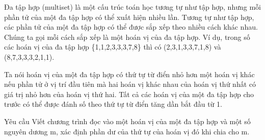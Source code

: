 Đa tập hợp (multiset) là một cấu trúc toán học tương tự như tập hợp, nhưng mỗi phần tử của một đa tập hợp có thể xuất hiện nhiều lần. Tương tự như tập hợp, các phần tử của một đa tập hợp có thể được sắp xếp theo nhiều cách khác nhau. Chúng ta gọi mỗi cách sắp xếp là một hoán vị của đa tập hợp. Ví dụ, trong số các hoán vị của đa tập hợp \{1,1,2,3,3,3,7,8\} thì có (2,3,1,3,3,7,1,8) và (8,7,3,3,3,2,1,1).  

   Ta nói hoán vị của một đa tập hợp có thứ tự từ điển nhỏ hơn một hoán vị khác nếu phần tử ở vị trí đầu tiên mà hai hoán vị khác nhau của hoán vị thứ nhất có giá trị nhỏ hơn của hoán vị thứ hai. Tất cả các hoán vị của một đa tập hợp cho trước có thể được đánh số theo thứ tự từ điển tăng dần bắt đầu từ 1.  

Yêu cầu
Viết chương trình đọc vào một hoán vị của một đa tập hợp và một số nguyên dương m, xác định phần dư của thứ tự của hoán vị đó khi chia cho m.